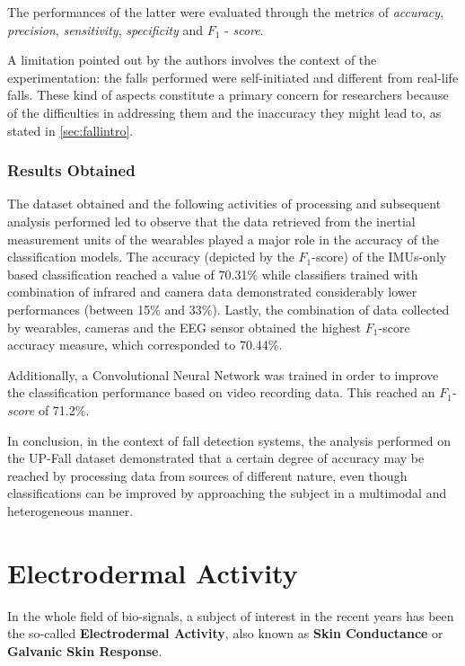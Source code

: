 The performances of the latter were evaluated through the metrics of \textit{accuracy}, \textit{precision}, \textit{sensitivity}, \textit{specificity} and $F_1$ - \textit{score}.

A limitation pointed out by the authors \cite{umafall} involves the context of the experimentation: the falls performed were self-initiated and different from real-life falls. These kind of aspects constitute a primary concern for researchers because of the difficulties in addressing them and the inaccuracy they might lead to, as stated in \ref{sec:fallintro}.

\subsubsection{Results Obtained}\label{subsubsec:upfall-results}

The dataset obtained and the following activities of processing and subsequent analysis performed led to observe that the data retrieved from the inertial measurement units of the wearables played a major role in the accuracy of the classification models. The accuracy (depicted by the $F_1$-score) of the IMUs-only based classification reached a value of 70.31\% while classifiers trained with combination of infrared and camera data demonstrated considerably lower performances (between 15\% and 33\%). Lastly, the combination of data collected by wearables, cameras and the EEG sensor obtained the highest $F_1$-score accuracy measure, which corresponded to 70.44\%. 

Additionally, a Convolutional Neural Network was trained in order to improve the classification performance based on video recording data. This reached an $F_1$-\textit{score} of 71.2\%.

In conclusion, in the context of fall detection systems, the analysis performed on the UP-Fall dataset demonstrated that a certain degree of accuracy may be reached by processing data from sources of different nature, even though classifications can be improved by approaching the subject in a multimodal and heterogeneous manner.

\section{Electrodermal Activity}\label{sec:eda-description}

In the whole field of bio-signals, a subject of interest in the recent years has been the so-called \textbf{Electrodermal Activity}, also known as \textbf{Skin Conductance} or \textbf{Galvanic Skin Response}.

